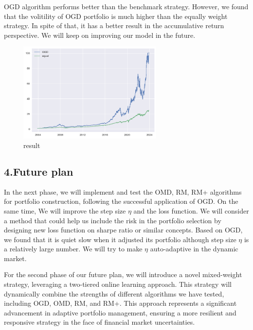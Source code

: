 \documentclass[]{report}
\begin{document}
OGD algorithm performs better than the benchmark strategy. However, we found that the volitility of OGD portfolio is much higher than the equally weight strategy. In spite of that, it has a better result in the accumulative return perspective. We will keep on improving our model in the future.

\begin{figure}[ht]
    \centering
    \includegraphics[height=5cm,keepaspectratio]{2.png}
    \caption{result}
\label{fig:result}
\end{figure}
\subsection*{4.Future plan}
In the next phase, we will implement and test the OMD, RM, RM+ algorithms for portfolio construction, following the successful application of OGD. On the same time, We will improve the step size $\eta$ and the loss function. We will consider a method that could help us include the risk in the portfolio selection by designing new loss function on sharpe ratio or similar concepts. Based on OGD, we found that it is quiet slow when it adjusted its portfolio although step size $\eta$ is a relatively large number. We will try to make $\eta$ auto-adaptive in the dynamic market.

For the second phase of our future plan, we will introduce a novel mixed-weight strategy, leveraging a two-tiered online learning approach. This strategy will dynamically combine the strengths of different algorithms we have tested, including OGD, OMD, RM, and RM+.  This approach represents a significant advancement in adaptive portfolio management, ensuring a more resilient and responsive strategy in the face of financial market uncertainties.

\printbibliography
\end{document}
